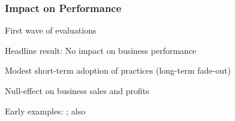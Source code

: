 \documentclass[hideothersubsections, usenames,dvipsnames,11pt]{beamer}
\newenvironment{itemize_2pt}{\itemize\addtolength{\itemsep}{2pt}}{\enditemize}
\begin{document}

\begin{frame}
\frametitle{Impact on Performance}
First wave of evaluations
	\begin{itemize_2pt}
	\item  Headline result: \textcolor{bdf}{No impact on business performance}
	\begin{itemize_2pt}
		\item Modest short-term adoption of practices (long-term fade-out)
		\item Null-effect on business sales and profits
		\item Early examples: \citet{Field2010, Karlan2011, Bruhn2013}; also \citet[][WP in 2014]{Gine2021} 
	
	\end{itemize_2pt}
\end{itemize_2pt}
\end{frame}
\end{document}

